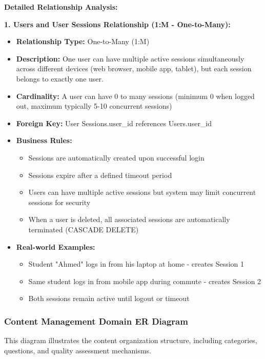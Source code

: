 \documentclass[12pt,a4paper,oneside]{book}
\begin{document}
\textbf{Detailed Relationship Analysis:}

\textbf{1. Users and User Sessions Relationship (1:M - One-to-Many):}
\begin{itemize}
    \item \textbf{Relationship Type:} One-to-Many (1:M)
    \item \textbf{Description:} One user can have multiple active sessions simultaneously across different devices (web browser, mobile app, tablet), but each session belongs to exactly one user.
    \item \textbf{Cardinality:} A user can have 0 to many sessions (minimum 0 when logged out, maximum typically 5-10 concurrent sessions)
    \item \textbf{Foreign Key:} User Sessions.user\_id references Users.user\_id
    \item \textbf{Business Rules:} 
        \begin{itemize}
            \item Sessions are automatically created upon successful login
            \item Sessions expire after a defined timeout period
            \item Users can have multiple active sessions but system may limit concurrent sessions for security
            \item When a user is deleted, all associated sessions are automatically terminated (CASCADE DELETE)
        \end{itemize}
    \item \textbf{Real-world Examples:}
        \begin{itemize}
            \item Student "Ahmed" logs in from his laptop at home - creates Session 1
            \item Same student logs in from mobile app during commute - creates Session 2
            \item Both sessions remain active until logout or timeout
        \end{itemize}
\end{itemize}

\subsubsection{Content Management Domain ER Diagram}

This diagram illustrates the content organization structure, including categories, questions, and quality assessment mechanisms.
\end{document}
